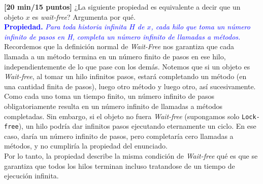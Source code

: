 \item[\textbf{2.}] \textbf{[20 min/15 puntos]} \textcolor{dkgreen}{¿La siguiente propiedad es equivalente a decir que un objeto $x$ es \textit{wait-free}? Argumenta por qué.}\\
\textcolor{blue}{\textbf{Propiedad.} \textit{Para toda historia infinita $H$ de $x$, cada hilo que toma un número infinito de pasos en H, completa un número infinito de llamadas a métodos.}}
Recordemos que la definición normal de \textit{Wait-Free} nos garantiza que cada llamada a un método termina en un número finito de pasos en ese hilo, independientemente de lo que pase con los demás. Notemos que si un objeto es \textit{Wait-free}, al tomar un hilo infinitos pasos, estará completando un método (en una cantidad finita de pasos), luego otro método y luego otro, así sucesivamente. Como cada uno toma un tiempo finito, un número infinito de pasos obligatoriamente resulta en un número infinito de llamadas a métodos completadas. Sin embargo, si el objeto no fuera \textit{Wait-free} (supongamos solo \texttt{Lock-free}), un hilo podría dar infinitos pasos ejecutando eternamente un ciclo. En ese caso, daría un número infinito de pasos, pero completaría cero llamadas a métodos, y no cumpliría la propiedad del enunciado.\\
Por lo tanto, la propiedad describe la misma condición de \textit{Wait-free} qué es que se garantiza que todos los hilos terminan incluso tratandose de un tiempo de ejecución infinita.





